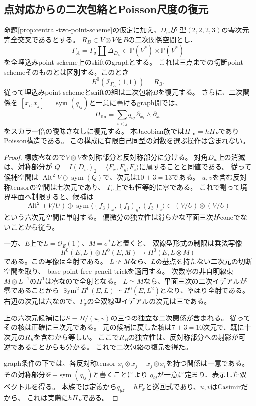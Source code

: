 \subsection{点対応からの二次包絡とPoisson尺度の復元}

\begin{proposition}[点対応の双線型イデアルによる二次包絡の復元]
\label{prop:point-correspondence-quadratic-recovery}
命題\ref{prop:central-two-point-scheme}の仮定に加え、$D_w$が
型$(2,2,2,3)$の零次元完全交叉であるとする。
$R_B\subset V\otimes V$を$B$の二次関係空間とし、
\[
 \Gamma_A=\Gamma_\sigma\amalg\Delta_{D_w}
 \subset\mathbb P(V^*)\times\mathbb P(V^*)
\]
を全埋込みpoint scheme上のshiftのgraphとする。
これは三点までの切断point schemeそのものとは区別する。このとき
\[
 \boxed{H^0(\mathcal I_{\Gamma_A}(1,1))=R_B.}
\]
従って埋込みpoint schemeとshiftの組は二次包絡$B$を復元する。
さらに、二次関係を
$[x_i,x_j]=\operatorname{sym}(q_{ij})$と一意に書けるgraph開では、
\[
 \Pi_{\mathrm{fin}}=\sum_{i<j}q_{ij}\,
       \partial_{x_i}\wedge\partial_{x_j}
\]
をスカラー倍の曖昧さなしに復元する。
本Jacobian族では$\Pi_{\mathrm{fin}}=h\Pi_F$でありPoisson構造である。
この構成に有限自己同型の対数を選ぶ操作は含まれない。
\end{proposition}

\begin{proof}
標数零なので$V\otimes V$を対称部分と反対称部分に分ける。
対角$D_w$上の消滅は、対称部分が
$Q=I(D_w)_2=\langle F_x,F_y,F_z\rangle$に属することと同値である。
従って候補空間は
$\operatorname{Alt}^2V\oplus\operatorname{sym}(Q)$で、次元は$10+3=13$である。
$u,v$を含む反対称tensorの空間は七次元であり、
$\Gamma_\sigma$上でも恒等的に零である。
これで割って境界平面へ制限すると、候補は
\[
 \operatorname{Alt}^2(V/U)\oplus
 \operatorname{sym}\langle(f_3)_x,(f_3)_y,(f_3)_z\rangle
 \subset (V/U)\otimes(V/U)
\]
という六次元空間に単射する。
偏微分の独立性は滑らかな平面三次がconeでないことから従う。

一方、$E$上で$L=\mathcal O_E(1)$、$M=\sigma^*L$と置くと、
双線型形式の制限は乗法写像
\[
 H^0(E,L)\otimes H^0(E,M)\longrightarrow H^0(E,L\otimes M)
\]
である。この写像は全射である。
$L\not\simeq M$なら、$L$の基点を持たない二次元の切断空間を取り、
base-point-free pencil trickを適用する。
次数零の非自明線束$M\otimes L^{-1}$の$H^1$は零なので全射となる。
$L\simeq M$なら、平面三次の二次イデアルが零であることから
$\operatorname{Sym}^2H^0(E,L)\simeq H^0(E,L^2)$となり、やはり全射である。
右辺の次元は六なので、$\Gamma_\sigma$の全双線型イデアルの次元は三である。

上の六次元候補には$S=B/(u,v)$の三つの独立な二次関係が含まれる。
従ってその核は正確に三次元である。
元の候補に戻した核は$7+3=10$次元で、既に十次元の$R_B$を含むから等しい。
ここで$R_B$の独立性は、反対称部分への射影が可逆であることからも分かる。
これで二次包絡の復元を得た。

graph条件の下では、各反対称tensor
$x_i\otimes x_j-x_j\otimes x_i$を持つ関係は一意である。
その対称部分を$-\operatorname{sym}(q_{ij})$と書くことにより
$q_{ij}$が一意に定まり、表示した双ベクトルを得る。
本族では定義から$q_{yz}=hF_x$と巡回式であり、$u,v$はCasimirだから、
これは実際に$h\Pi_F$である。
\end{proof}

